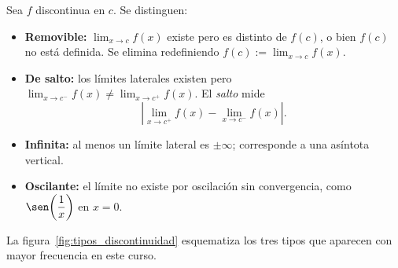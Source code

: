 \begin{definition}
Sea $f$ discontinua en $c$. Se distinguen:
\begin{itemize}
  \item \textbf{Removible:} $\lim_{x\to c}f(x)$ existe pero es distinto de
        $f(c)$, o bien $f(c)$ no está definida. Se elimina redefiniendo
        $f(c):=\lim_{x\to c}f(x)$.
  \item \textbf{De salto:} los límites laterales existen pero
        $\lim_{x\to c^-}f(x)\neq\lim_{x\to c^+}f(x)$. El \emph{salto} mide
        \[
          \left|\lim_{x\to c^+}f(x) - \lim_{x\to c^-}f(x)\right|.
        \]
  \item \textbf{Infinita:} al menos un límite lateral es $\pm\infty$;
        corresponde a una asíntota vertical.
  \item \textbf{Oscilante:} el límite no existe por oscilación sin
        convergencia, como $\sen\!\left(\dfrac{1}{x}\right)$ en $x=0$.
\end{itemize}
\end{definition}

La figura~\ref{fig:tipos_discontinuidad} esquematiza los tres tipos que
aparecen con mayor frecuencia en este curso.

